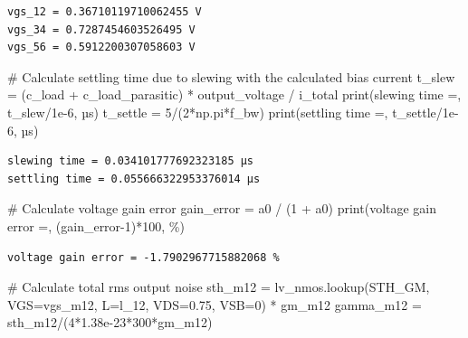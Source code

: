 \documentclass[
  a4paper,
  DIV=11,
  numbers=noendperiod]{scrartcl}
\newenvironment{Shaded}{\begin{snugshade}}{\end{snugshade}}
\newcommand{\BuiltInTok}[1]{\textcolor[rgb]{0.00,0.23,0.31}{#1}}
\newcommand{\CommentTok}[1]{\textcolor[rgb]{0.37,0.37,0.37}{#1}}
\newcommand{\DecValTok}[1]{\textcolor[rgb]{0.68,0.00,0.00}{#1}}
\newcommand{\FloatTok}[1]{\textcolor[rgb]{0.68,0.00,0.00}{#1}}
\newcommand{\NormalTok}[1]{\textcolor[rgb]{0.00,0.23,0.31}{#1}}
\newcommand{\OperatorTok}[1]{\textcolor[rgb]{0.37,0.37,0.37}{#1}}
\newcommand{\StringTok}[1]{\textcolor[rgb]{0.13,0.47,0.30}{#1}}
\begin{document}
\begin{tcolorbox}
\begin{verbatim}
vgs_12 = 0.36710119710062455 V
vgs_34 = 0.7287454603526495 V
vgs_56 = 0.5912200307058603 V
\end{verbatim}

\begin{Shaded}
\begin{Highlighting}[]
\CommentTok{\# Calculate settling time due to slewing with the calculated bias current}
\NormalTok{t\_slew }\OperatorTok{=}\NormalTok{ (c\_load }\OperatorTok{+}\NormalTok{ c\_load\_parasitic) }\OperatorTok{*}\NormalTok{ output\_voltage }\OperatorTok{/}\NormalTok{ i\_total}
\BuiltInTok{print}\NormalTok{(}\StringTok{\textquotesingle{}slewing time =\textquotesingle{}}\NormalTok{, t\_slew}\OperatorTok{/}\FloatTok{1e{-}6}\NormalTok{, }\StringTok{\textquotesingle{}µs\textquotesingle{}}\NormalTok{)}
\NormalTok{t\_settle }\OperatorTok{=} \DecValTok{5}\OperatorTok{/}\NormalTok{(}\DecValTok{2}\OperatorTok{*}\NormalTok{np.pi}\OperatorTok{*}\NormalTok{f\_bw)}
\BuiltInTok{print}\NormalTok{(}\StringTok{\textquotesingle{}settling time =\textquotesingle{}}\NormalTok{, t\_settle}\OperatorTok{/}\FloatTok{1e{-}6}\NormalTok{, }\StringTok{\textquotesingle{}µs\textquotesingle{}}\NormalTok{)}
\end{Highlighting}
\end{Shaded}

\begin{verbatim}
slewing time = 0.034101777692323185 µs
settling time = 0.055666322953376014 µs
\end{verbatim}

\begin{Shaded}
\begin{Highlighting}[]
\CommentTok{\# Calculate voltage gain error}
\NormalTok{gain\_error }\OperatorTok{=}\NormalTok{ a0 }\OperatorTok{/}\NormalTok{ (}\DecValTok{1} \OperatorTok{+}\NormalTok{ a0)}
\BuiltInTok{print}\NormalTok{(}\StringTok{\textquotesingle{}voltage gain error =\textquotesingle{}}\NormalTok{, (gain\_error}\OperatorTok{{-}}\DecValTok{1}\NormalTok{)}\OperatorTok{*}\DecValTok{100}\NormalTok{, }\StringTok{\textquotesingle{}\%\textquotesingle{}}\NormalTok{)}
\end{Highlighting}
\end{Shaded}

\begin{verbatim}
voltage gain error = -1.7902967715882068 %
\end{verbatim}

\begin{Shaded}
\begin{Highlighting}[]
\CommentTok{\# Calculate total rms output noise}
\NormalTok{sth\_m12 }\OperatorTok{=}\NormalTok{ lv\_nmos.lookup(}\StringTok{\textquotesingle{}STH\_GM\textquotesingle{}}\NormalTok{, VGS}\OperatorTok{=}\NormalTok{vgs\_m12, L}\OperatorTok{=}\NormalTok{l\_12, VDS}\OperatorTok{=}\FloatTok{0.75}\NormalTok{, VSB}\OperatorTok{=}\DecValTok{0}\NormalTok{) }\OperatorTok{*}\NormalTok{ gm\_m12}
\NormalTok{gamma\_m12 }\OperatorTok{=}\NormalTok{ sth\_m12}\OperatorTok{/}\NormalTok{(}\DecValTok{4}\OperatorTok{*}\FloatTok{1.38e{-}23}\OperatorTok{*}\DecValTok{300}\OperatorTok{*}\NormalTok{gm\_m12)}


\end{Highlighting}
\end{Shaded}
\end{tcolorbox}
\end{document}
